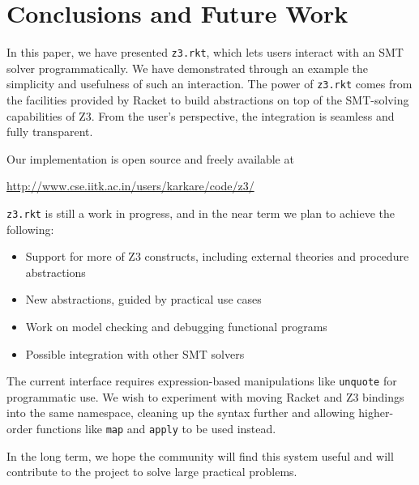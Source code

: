\section{Conclusions and Future Work}

In this paper, we have presented \texttt{z3.rkt}, which lets users interact with
an SMT solver programmatically. We have demonstrated through an example the
simplicity and usefulness of such an interaction. The power of \texttt{z3.rkt}
comes from the facilities provided by Racket to build abstractions on top of the
SMT-solving capabilities of Z3. From the user's perspective, the integration is
seamless and fully transparent.

Our implementation is open source and freely available at
\begin{center}
\url{http://www.cse.iitk.ac.in/users/karkare/code/z3/}
\end{center}

\texttt{z3.rkt} is still a work in progress, and in the near term we plan to
achieve the following:

\begin{itemize}
\item Support for more of Z3 constructs, including external theories and procedure abstractions
\item New abstractions, guided by practical use cases
\item Work on model checking and debugging functional programs
\item Possible integration with other SMT solvers
\end{itemize}

The current interface requires expression-based manipulations like
\texttt{unquote} for programmatic use. We wish to experiment with moving Racket
and Z3 bindings into the same namespace, cleaning up the syntax further and
allowing higher-order functions like \texttt{map} and \texttt{apply} to be used
instead.

In the long term, we hope the community will find this system useful and
will contribute to the project to solve large practical problems.
